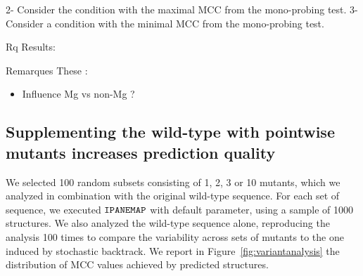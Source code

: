 \documentclass[a4,center,fleqn]{NAR}
\newcommand{\Software}[1]{$\text{\ttfamily #1}$}
\newcommand{\OurTool}{\Software{IPANEMAP}\xspace}
\newcommand{\Draft}[1]{{#1}}
\newcommand{\as}[1]{\Draft{\todo[color=green!70!black]{\sf Afaf: #1}}}
\begin{document}
2- Consider the condition with the maximal MCC from the mono-probing test.
3- Consider a condition with the minimal MCC from the mono-probing test.

Rq Results:



Remarques These :
\begin{itemize}
	\item Influence Mg vs non-Mg ?
\end{itemize}







% 
%



\subsection{Supplementing the wild-type with pointwise mutants increases prediction quality}
We selected 100 random subsets consisting of 1, 2, 3 or 10 mutants, which we analyzed in combination with the original wild-type sequence.
For each set of sequence, we executed \OurTool{} with default parameter, using a sample of 1000 structures. 
We also analyzed the wild-type sequence alone, reproducing the analysis 100 times to compare the variability across sets of mutants to the one induced by stochastic backtrack. 
We report in Figure~\ref{fig:variantanalysis} the distribution of MCC values achieved by predicted structures.
\end{document}
